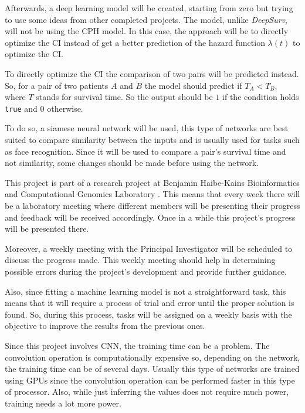 Afterwards, a deep learning model will be created, starting from zero but trying to use some
ideas from other completed projects. The model, unlike \emph{DeepSurv}, will not be using
the \gls{CPH} model. In this case, the approach will be to directly optimize the \gls{CI}
instead of get a better prediction of the hazard function \( \lambda(t) \) to optimize 
the \gls{CI}.

To directly optimize the \gls{CI} the comparison of two pairs will be predicted instead. So,
for a pair of two patients \( A \) and \( B \) the model should predict if \( T_A < T_B \),
where \( T \) stands for survival time. So the output should be \( 1 \) if the condition holds
\texttt{true} and \( 0 \) otherwise.

To do so, a siamese neural network will be used,
this type of networks are best suited to compare similarity between the inputs and is usually
used for tasks such as face recognition. Since it will be used to compare a pair's survival
time and not similarity, some changes should be made before using the network.


This project is part of a research project at Benjamin Haibe-Kains Bioinformatics and 
Computational Genomics Laboratory \cite{bhklab}. This means that every week there will be a 
laboratory meeting where different members will be presenting their progress and feedback will
be received accordingly. Once in a while this project's progress will be presented there.

Moreover, a weekly meeting with the Principal Investigator will be scheduled to discuss
the progress made. This weekly meeting should help in determining possible errors during the 
project's development and provide further guidance.

Also, since fitting a machine learning model is not a straightforward task, this means that 
it will require a process of trial and error until the proper solution is found. 
So, during this process, tasks will be assigned on a weekly basis with the objective to
improve the results from the previous ones.



Since this project involves \gls{CNN}, the training time can be a problem. 
The convolution operation is computationally expensive so, depending on the network, the 
training time can be of several days. Usually this type of networks are trained using 
GPUs since the convolution operation can be performed faster in this type of processor. 
Also, while just inferring the values does not require
much power, training needs a lot more power. 

